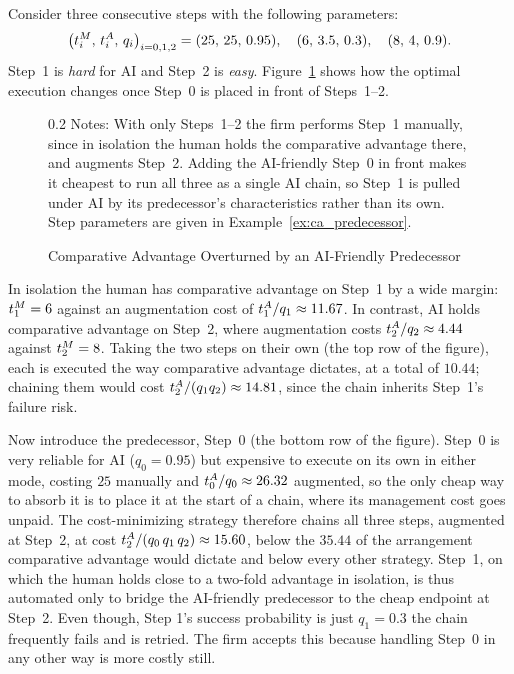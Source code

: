 \begin{example}
\label{ex:ca_predecessor}
Consider three consecutive steps with the following parameters:
\[ \bigl(t^{M}_{i},\, t^{A}_{i},\, q_i\bigr)_{i=0,1,2} = (25,\,25,\,0.95),\quad (6,\,3.5,\,0.3),\quad (8,\,4,\,0.9). \]
Step~1 is \emph{hard} for AI and Step~2 is \emph{easy}.
Figure~\ref{fig:ex_predecessor} shows how the optimal execution changes once Step~0 is placed in front of Steps~1--2.
\begin{figure}[!t]
\caption{Comparative Advantage Overturned by an AI-Friendly Predecessor}
\label{fig:ex_predecessor}
\centering

\par\vspace{\fignotesskip}
\begin{minipage}{1\linewidth}
\begin{spacing}{0.2}
{\fontsize{9.5pt}{10pt}\selectfont Notes: With only Steps~1--2 the firm performs Step~1 manually, since in isolation the human holds the comparative advantage there, and augments Step~2. Adding the AI-friendly Step~0 in front makes it cheapest to run all three as a single AI chain, so Step~1 is pulled under AI by its predecessor's characteristics rather than its own. Step parameters are given in Example~\ref{ex:ca_predecessor}.}
\end{spacing}
\end{minipage}
\end{figure}
In isolation the human has comparative advantage on Step~1 by a wide margin: $t^{M}_{1} = 6$ against an augmentation cost of $t^{A}_{1}/q_1 \approx 11.67$. 
In contrast, AI holds comparative advantage on Step~2, where augmentation costs $t^{A}_{2}/q_2 \approx 4.44$ against $t^{M}_{2} = 8$.
Taking the two steps on their own (the top row of the figure), each is executed the way comparative advantage dictates, at a total of $10.44$; chaining them would cost $t^{A}_{2}/(q_1 q_2) \approx 14.81$, since the chain inherits Step~1's failure risk.

Now introduce the predecessor, Step~0 (the bottom row of the figure).
Step~0 is very reliable for AI ($q_0 = 0.95$) but expensive to execute on its own in either mode, costing $25$ manually and $t^{A}_{0}/q_0 \approx 26.32$ augmented, so the only cheap way to absorb it is to place it at the start of a chain, where its management cost goes unpaid.
The cost-minimizing strategy therefore chains all three steps, augmented at Step~2, at cost $t^{A}_{2}/(q_0\, q_1\, q_2) \approx 15.60$, below the $35.44$ of the arrangement comparative advantage would dictate and below every other strategy.
Step~1, on which the human holds close to a two-fold advantage in isolation, is thus automated only to bridge the AI-friendly predecessor to the cheap endpoint at Step~2.
Even though, Step 1's success probability is just $q_1 = 0.3$ the chain frequently fails and is retried. 
The firm accepts this because handling Step~0 in any other way is more costly still.
\end{example}

